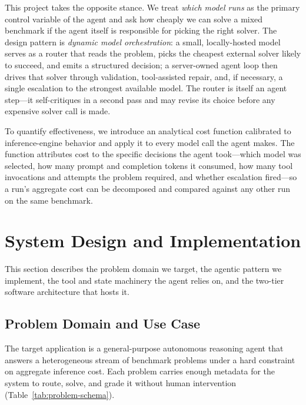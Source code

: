 \documentclass[10pt]{article}
\begin{document}
This project takes the opposite stance. We treat \emph{which model runs} as the
primary control variable of the agent and ask how cheaply we can solve a mixed
benchmark if the agent itself is responsible for picking the right solver. The design
pattern is \emph{dynamic model orchestration}: a small, locally-hosted model serves
as a router that reads the problem, picks the cheapest external solver likely to
succeed, and emits a structured decision; a server-owned agent loop then drives that
solver through validation, tool-assisted repair, and, if necessary, a single
escalation to the strongest available model. The router is itself an agent step---it
self-critiques in a second pass and may revise its choice before any expensive solver
call is made.

To quantify effectiveness, we introduce an analytical cost function calibrated to
inference-engine behavior and apply it to every model call the agent makes. The
function attributes cost to the specific decisions the agent took---which model was
selected, how many prompt and completion tokens it consumed, how many tool
invocations and attempts the problem required, and whether escalation fired---so a
run's aggregate cost can be decomposed and compared against any other run on the same
benchmark.

\section{System Design and Implementation}
\label{sec:architecture}
This section describes the problem domain we target, the agentic pattern we
implement, the tool and state machinery the agent relies on, and the two-tier
software architecture that hosts it.

\subsection{Problem Domain and Use Case}
\label{sec:domain}
The target application is a general-purpose autonomous reasoning agent that answers a
heterogeneous stream of benchmark problems under a hard constraint on aggregate
inference cost. Each problem carries enough metadata for the system to route, solve,
and grade it without human intervention (Table~\ref{tab:problem-schema}).
\end{document}
